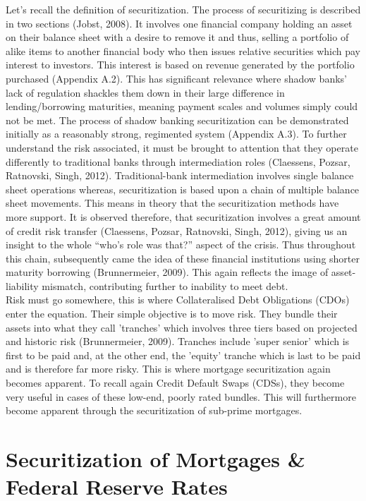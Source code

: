 \documentclass[11pt, english]{article}
\begin{document}
	Let's recall the definition of securitization. The process of securitizing is described in two sections (Jobst, 2008). It involves one financial company holding an asset on their balance sheet with a desire to remove it and thus, selling a portfolio of alike items to another financial body who then issues relative securities which pay interest to investors. This interest is based on revenue generated by the portfolio purchased (Appendix A.2). This has significant relevance where shadow banks' lack of regulation shackles them down in their large difference in lending/borrowing maturities, meaning payment scales and volumes simply could not be met. The process of shadow banking securitization can be demonstrated initially as a reasonably strong, regimented system (Appendix A.3). To further understand the risk associated, it must be brought to attention that they operate differently to traditional banks through intermediation roles (Claessens, Pozsar, Ratnovski, Singh, 2012). Traditional-bank intermediation involves single balance sheet operations whereas, securitization is based upon a chain of multiple balance sheet movements. This means in theory that the securitization methods have more support. It is observed therefore, that securitization involves a great amount of credit risk transfer (Claessens, Pozsar, Ratnovski, Singh, 2012), giving us an insight to the whole ``who's role was that?'' aspect of the crisis. Thus throughout this chain, subsequently came the idea of these financial institutions using shorter maturity borrowing (Brunnermeier, 2009). This again reflects the image of asset-liability mismatch, contributing further to inability to meet debt.\\

	Risk must go somewhere, this is where Collateralised Debt Obligations (CDOs) enter the equation. Their simple objective is to move risk. They bundle their assets into what they call 'tranches' which involves three tiers based on projected and historic risk (Brunnermeier, 2009). Tranches include 'super senior' which is first to be paid and, at the other end, the 'equity' tranche which is last to be paid and is therefore far more risky. This is where mortgage securitization again becomes apparent. To recall again Credit Default Swaps (CDSs), they become very useful in cases of these low-end, poorly rated bundles. This will furthermore become apparent through the securitization of sub-prime mortgages.

\newpage

\section{Securitization of Mortgages \& Federal Reserve Rates}
\end{document}
